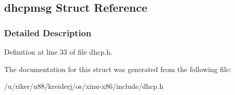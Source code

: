 \hypertarget{structdhcpmsg}{}\subsection{dhcpmsg Struct Reference}
\label{structdhcpmsg}


\subsubsection{Detailed Description}


Definition at line 33 of file dhcp.\+h.



The documentation for this struct was generated from the following file\+:\begin{DoxyCompactItemize}
\item 
/u/riker/u88/kreiderj/os/xinu-\/x86/include/dhcp.\+h\end{DoxyCompactItemize}
